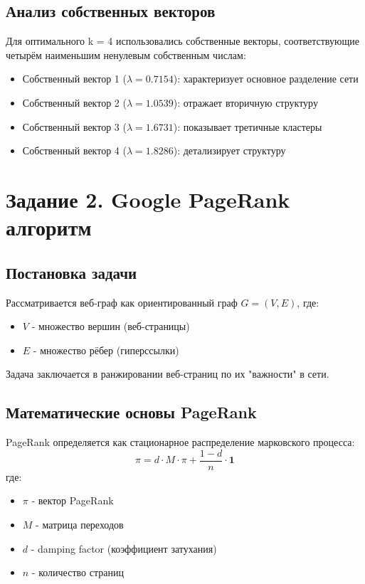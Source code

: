\subsection*{Анализ собственных векторов}

Для оптимального k = 4 использовались собственные векторы, соответствующие четырём наименьшим ненулевым собственным числам:

\begin{itemize}
    \item Собственный вектор 1 ($\lambda = 0.7154$): характеризует основное разделение сети
    \item Собственный вектор 2 ($\lambda = 1.0539$): отражает вторичную структуру
    \item Собственный вектор 3 ($\lambda = 1.6731$): показывает третичные кластеры
    \item Собственный вектор 4 ($\lambda = 1.8286$): детализирует структуру
\end{itemize}

\section*{Задание 2. Google PageRank алгоритм}

\subsection*{Постановка задачи}

Рассматривается веб-граф как ориентированный граф $G = (V, E)$, где:
\begin{itemize}
    \item $V$ - множество вершин (веб-страницы)
    \item $E$ - множество рёбер (гиперссылки)
\end{itemize}

Задача заключается в ранжировании веб-страниц по их "важности" в сети.

\subsection*{Математические основы PageRank}

PageRank определяется как стационарное распределение марковского процесса:
\begin{equation}
\pi = d \cdot M \cdot \pi + \frac{1-d}{n} \cdot \mathbf{1}
\end{equation}
где:
\begin{itemize}
    \item $\pi$ - вектор PageRank
    \item $M$ - матрица переходов
    \item $d$ - damping factor (коэффициент затухания)
    \item $n$ - количество страниц
\end{itemize}

